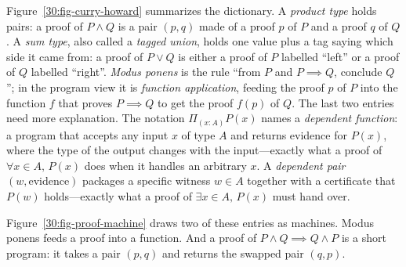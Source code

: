 Figure~\ref{30:fig-curry-howard} summarizes the dictionary. A \emph{product type} holds pairs: a proof of $P \land Q$ is a pair $(p, q)$ made of a proof $p$ of $P$ and a proof $q$ of $Q$. A \emph{sum type}, also called a \emph{tagged union}, holds one value plus a tag saying which side it came from: a proof of $P \lor Q$ is either a proof of $P$ labelled ``left'' or a proof of $Q$ labelled ``right''. \emph{Modus ponens} is the rule ``from $P$ and $P \implies Q$, conclude $Q$''; in the program view it is \emph{function application}, feeding the proof $p$ of $P$ into the function $f$ that proves $P \implies Q$ to get the proof $f(p)$ of $Q$. The last two entries need more explanation. The notation $\Pi_{(x:A)} P(x)$ names a \emph{dependent function}: a program that accepts any input $x$ of type $A$ and returns evidence for $P(x)$, where the type of the output changes with the input---exactly what a proof of $\forall x \in A, \, P(x)$ does when it handles an arbitrary $x$. A \emph{dependent pair} $(w, \text{evidence})$ packages a specific witness $w \in A$ together with a certificate that $P(w)$ holds---exactly what a proof of $\exists x \in A, \, P(x)$ must hand over.

Figure~\ref{30:fig-proof-machine} draws two of these entries as machines. Modus ponens feeds a proof into a function. And a proof of $P \land Q \implies Q \land P$ is a short program: it takes a pair $(p, q)$ and returns the swapped pair $(q, p)$.

